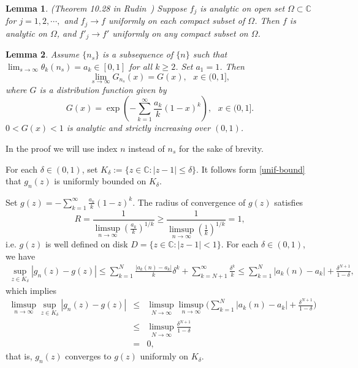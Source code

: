 \documentclass[11pt]{article}
\newtheorem{lemma}{\textbf{Lemma}}[section]
\numberwithin{equation}{section}
\begin{document}
\begin{lemma}\label{complexlimit} (Theorem 10.28 in Rudin~\cite{RudinComplex}) Suppose $f_j$ is analytic on
open set $\Omega\subset \mathbb{C}$ for $j=1,2,\cdots,$ and
$f_j\rightarrow f$ uniformly on each compact subset of $\Omega$.
Then $f$ is analytic on $\Omega$, and $f'_j\rightarrow f'$ uniformly
on any compact subset on $\Omega$.
\end{lemma}


\begin{lemma}\label{sufficiency}
Assume $\{n_s\}$ is a subsequence of $\{n\}$ such that
$\lim_{s\to\infty}\theta_k(n_s)=a_k\in[0,1]$ for all $k\ge 2$. Set
$a_1=1$. Then
\begin{equation}\label{Gn-limit}
\lim_{s\to\infty}G_{n_s}(x)=G(x), ~~~x\in (0,1],
\end{equation}
where $G$ is a distribution function given by
\begin{equation}\label{Grep}
G(x)=\exp(-\sum^\infty_{k=1}\frac{a_k}{k}(1-x)^k), ~~~x\in (0,1].
\end{equation}
$0<G(x)<1$ is analytic and strictly increasing over $(0,1)$.
\end{lemma}



  In the proof  we will use index $n$ instead
of $n_s$ for the sake of brevity.


For each $\delta\in(0,1)$, set $K_\delta:=\{z\in \mathbb{C}:
 |z-1|\leq\delta\}$. It follows form \eqref{unif-bound} that
 $g_n(z)$ is uniformly bounded on $K_\delta$.

Set $g(z)=-\sum_{k=1}^\infty \frac{a_k}{k}(1-z)^k$. The radius of
convergence of $g(z)$ satisfies
$$
R=\frac{1}{\limsup_{n\rightarrow \infty} \left(
\frac{a_k}{k}\right)^{1/k} }\geq\frac{1}{\limsup_{n\rightarrow
\infty} \left( \frac{1}{k}\right)^{1/k} } =1,
$$
i.e. $g(z)$ is well defined on disk $D=\{z\in\mathbb{C}: |z-1|<1\}$.
For each $\delta\in(0,1)$, we have
\begin{align*}
  \sup_{z\in K_\delta} |g_n(z)-g(z)|\leq \sum_{k=1}^N\frac{|a_k{(n)}-a_k|}{k}\delta^k
+\sum_{k=N+1}^\infty \frac{\delta^k}{k}\leq
\sum_{k=1}^N|a_k{(n)}-a_k|+\frac{\delta^{N+1}}{1-\delta},
\end{align*}
which implies
\begin{eqnarray*}
\limsup_{n\rightarrow \infty} \sup_{z\in K_\delta}
|g_n(z)-g(z)|&\le& \limsup_{N\rightarrow
\infty}\limsup_{n\rightarrow \infty}
\Big(\sum_{k=1}^N|a_k{(n)}-a_k|+\frac{\delta^{N+1}}{1-\delta}\Big)\\
&\leq &  \limsup_{N\rightarrow
\infty}\frac{\delta^{N+1}}{1-\delta}\\
&=&0,
\end{eqnarray*}
that is, $g_n(z)$ converges to $g(z)$ uniformly on $K_\delta$.
\end{document}
